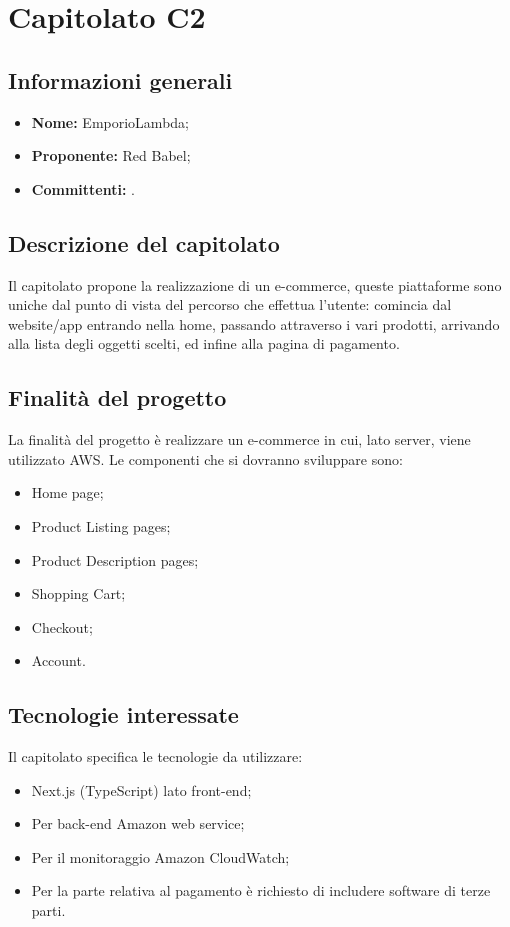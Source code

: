 \section{Capitolato C2}

\subsection{Informazioni generali}
\begin{itemize}
\item \textbf{Nome:} EmporioLambda;
\item \textbf{Proponente:} Red Babel;
\item \textbf{Committenti:} \committenti{}.
\end{itemize}

\subsection{Descrizione del capitolato}
Il capitolato propone la realizzazione di un e-commerce, queste piattaforme sono uniche dal punto di vista del percorso che effettua l'utente: comincia dal website/app entrando nella home, passando attraverso i vari prodotti, arrivando alla lista degli oggetti scelti, ed infine alla pagina di pagamento. 

\subsection{Finalità del progetto}
La finalità del progetto è realizzare un e-commerce in cui, lato server, viene utilizzato AWS. Le componenti che si dovranno sviluppare sono:
\begin{itemize}
\item Home page;
\item Product Listing pages;
\item Product Description pages;
\item Shopping Cart;
\item Checkout;
\item Account.
\end{itemize}

\subsection{Tecnologie interessate}
Il capitolato specifica le tecnologie da utilizzare:
\begin{itemize}
\item Next.js (TypeScript) lato front-end;
\item Per back-end Amazon web service;
\item Per il monitoraggio Amazon CloudWatch;
\item Per la parte relativa al pagamento è richiesto di includere software di terze parti.
\end{itemize}

